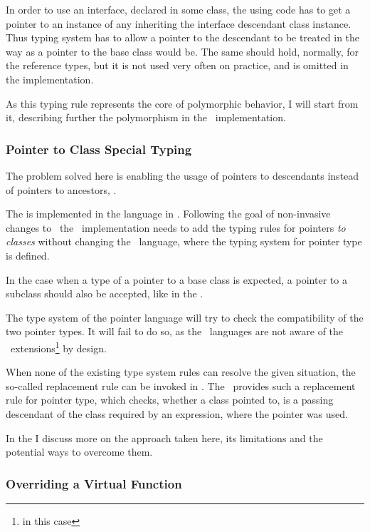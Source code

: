 In order to use an interface, declared in some class, the using code has to get a pointer to an instance
of any inheriting the interface descendant class instance. Thus typing system has to allow a pointer
to the descendant to be treated in the way as a pointer to the base class would be. The same should hold, 
normally, for the reference types, but it is not used very often on practice, and is omitted in the implementation.

As this typing rule represents the core of polymorphic behavior, I will start from it, describing further the
polymorphism in the \pcpp\ implementation.

\subsubsection{Pointer to Class Special Typing}

The problem solved here is enabling the usage of pointers to descendants instead of pointers to ancestors,
.


The   is implemented in the  language in \mbdr. 
Following the goal of non-invasive changes to \mbeddr\ the \pcpp\ implementation needs to add the 
typing rules for pointers \emph{to classes} without changing the    \mbdr\ language, where the 
typing system for pointer type is defined.

In the case when a type of a pointer to a base class is expected, a pointer to a subclass should also be accepted, like
in the .

The type system of the pointer language will try to check the compatibility of the two pointer types. It will
fail to do so, as the \mbdr\ languages are not aware of the \pcpp\ extensions\footnote{  in this case} 
by design.

When none of the existing type system rules can resolve the given situation, the so-called replacement
rule can be invoked in \jbmps. The \pcpp\ provides such a replacement rule for pointer type, which checks, whether a
class pointed to, is a passing descendant of the class required by an expression, where the pointer was
used.

In the  I discuss more on the approach taken here, its limitations and 
the potential ways to overcome them.

\subsubsection{Overriding a Virtual Function}

